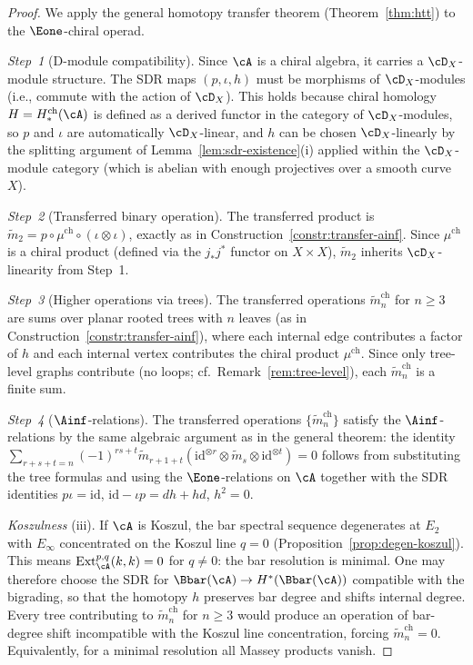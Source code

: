 \begin{proof}
We apply the general homotopy transfer theorem (Theorem~\ref{thm:htt}) to the $\Eone$-chiral operad.

\emph{Step~1} (D-module compatibility). Since $\cA$ is a chiral algebra, it carries a $\cD_X$-module structure. The SDR maps $(p, \iota, h)$ must be morphisms of $\cD_X$-modules (i.e., commute with the action of $\cD_X$). This holds because chiral homology $H = H^{\mathrm{ch}}_*(\cA)$ is defined as a derived functor in the category of $\cD_X$-modules, so $p$ and $\iota$ are automatically $\cD_X$-linear, and $h$ can be chosen $\cD_X$-linearly by the splitting argument of Lemma~\ref{lem:sdr-existence}(i) applied within the $\cD_X$-module category (which is abelian with enough projectives over a smooth curve~$X$).

\emph{Step~2} (Transferred binary operation). The transferred product is $\tilde{m}_2 = p \circ \mu^{\mathrm{ch}} \circ (\iota \otimes \iota)$, exactly as in Construction~\ref{constr:transfer-ainf}. Since $\mu^{\mathrm{ch}}$ is a chiral product (defined via the $j_*j^*$ functor on $X \times X$), $\tilde{m}_2$ inherits $\cD_X$-linearity from Step~1.

\emph{Step~3} (Higher operations via trees). The transferred operations $\tilde{m}_n^{\mathrm{ch}}$ for $n \geq 3$ are sums over planar rooted trees with $n$ leaves (as in Construction~\ref{constr:transfer-ainf}), where each internal edge contributes a factor of $h$ and each internal vertex contributes the chiral product $\mu^{\mathrm{ch}}$. Since only tree-level graphs contribute (no loops; cf.\ Remark~\ref{rem:tree-level}), each $\tilde{m}_n^{\mathrm{ch}}$ is a finite sum.

\emph{Step~4} ($\Ainf$-relations). The transferred operations $\{\tilde{m}_n^{\mathrm{ch}}\}$ satisfy the $\Ainf$-relations by the same algebraic argument as in the general theorem: the identity $\sum_{r+s+t=n}(-1)^{rs+t}\tilde{m}_{r+1+t}(\mathrm{id}^{\otimes r} \otimes \tilde{m}_s \otimes \mathrm{id}^{\otimes t}) = 0$ follows from substituting the tree formulas and using the $\Eone$-relations on $\cA$ together with the SDR identities $p\iota = \mathrm{id}$, $\mathrm{id} - \iota p = dh + hd$, $h^2 = 0$.

\emph{Koszulness} (iii). If $\cA$ is Koszul, the bar spectral sequence degenerates at $E_2$ with $E_\infty$ concentrated on the Koszul line $q = 0$ (Proposition~\ref{prop:degen-koszul}). This means $\mathrm{Ext}^{p,q}_{\cA}(k,k) = 0$ for $q \neq 0$: the bar resolution is minimal. One may therefore choose the SDR for $\Bbar(\cA) \to H^*(\Bbar(\cA))$ compatible with the bigrading, so that the homotopy $h$ preserves bar degree and shifts internal degree. Every tree contributing to $\tilde{m}_n^{\mathrm{ch}}$ for $n \geq 3$ would produce an operation of bar-degree shift incompatible with the Koszul line concentration, forcing $\tilde{m}_n^{\mathrm{ch}} = 0$. Equivalently, for a minimal resolution all Massey products vanish.
\end{proof}

